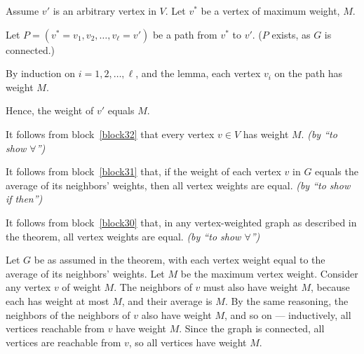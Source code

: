 \documentclass[11pt]{article}
\begin{document}
\begin{problems}
\begin{longFormProof}
\begin{block}[block30]
\begin{block}[block31]
        \vspace*{-1em}
        \hrulefill 
        \smallskip

        \begin{block}[block32]
          {Assume $v'$ is an arbitrary vertex in $V$.  
          Let $v^*$ be a vertex of maximum weight, $M$.}

          \step Let $P=(v^*=v_1,v_2,\ldots,v_\ell=v')$ be a path from $v^*$ to $v'$. 
          ($P$ exists, as $G$ is connected.)

          \step By induction on $i=1,2,\ldots,\ell$, and the lemma,
          each vertex $v_i$ on the path has weight $M$.

          \step Hence, the weight of $v'$ equals $M$.
        \end{block}
  
        \step It follows from block~\ref{block32} 
        that every vertex $v\in V$ has weight $M$.
        \hfill\emph{(by ``to show $\forall$'')}
      \end{block} %
  
      \step It follows from block~\ref{block31} that,
      if the weight of each vertex $v$ in $G$ equals the average of its neighbors' weights,
      then all vertex weights are equal.
      \hfill\emph{(by ``to show if then'')}
    \end{block} %

    \step It follows from block~\ref{block30} that, 
    in any vertex-weighted graph as described in the theorem,
    all vertex weights are equal.
    \hfill\emph{(by ``to show $\forall$'')}

  \end{longFormProof}

  \begin{shortFormProof}
    Let $G$ be as assumed in the theorem, 
    with each vertex weight equal to the average of its neighbors' weights.
    Let $M$ be the maximum vertex weight.
    Consider any vertex $v$ of weight $M$.
    The neighbors of $v$ must also have weight $M$,
    because each has weight at most $M$, and their average is $M$.
    By the same reasoning, the neighbors of the neighbors of $v$
    also have weight $M$, and so on --- inductively, all vertices reachable from $v$
    have weight $M$.
    Since the graph is connected, all vertices are reachable from $v$,
    so all vertices have weight $M$.
  \end{shortFormProof}



\end{problems}
\end{document}

